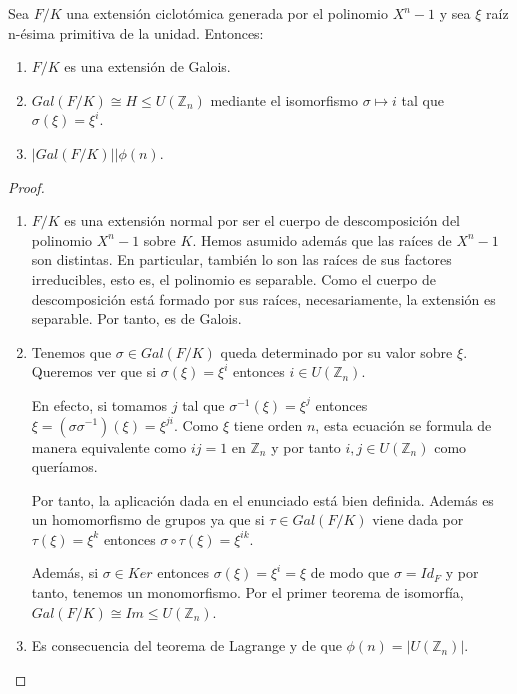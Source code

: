 \begin{theorem}
Sea $F/K$ una extensión ciclotómica generada por el polinomio $X^n-1$ y sea $\xi$ raíz n-ésima primitiva de la unidad. Entonces:

\begin{enumerate}
\item $F/K$ es una extensión de Galois. 
\item $Gal(F/K) \cong H \le U(\mathbb{Z}_n)$ mediante el isomorfismo $\sigma \mapsto i$ tal que $\sigma(\xi) = \xi^i$.
\item $|Gal(F/K)| | \phi(n)$. 
\end{enumerate}
\end{theorem}
\begin{proof}
\begin{enumerate}
\item $F/K$ es una extensión normal por ser el cuerpo de descomposición del polinomio $X^n - 1$ sobre $K$. Hemos asumido además que las raíces de $X^n - 1$ son distintas. En particular, también lo son las raíces de sus factores irreducibles, esto es, el polinomio es separable. Como el cuerpo de descomposición está formado por sus raíces, necesariamente, la extensión es separable. Por tanto, es de Galois. 

\item  Tenemos que $\sigma \in Gal(F/K)$ queda determinado por su valor sobre $\xi$. Queremos ver que si $\sigma(\xi) = \xi^i$ entonces $i \in U(\mathbb{Z}_n)$. 

En efecto, si tomamos $j$ tal que $\sigma^{-1}(\xi) = \xi^j$ entonces $\xi = (\sigma \sigma^{-1})( \xi) = \xi^{ji}$. Como $\xi$ tiene orden $n$, esta ecuación se formula de manera equivalente como $ij = 1$ en $\mathbb{Z}_n$ y por tanto $i,j \in U(\mathbb{Z}_n)$ como queríamos. 

Por tanto, la aplicación dada en el enunciado está bien definida. Además es un homomorfismo de grupos ya que si $\tau \in Gal(F/K)$ viene dada por $\tau(\xi) = \xi^k$ entonces $\sigma \circ \tau (\xi) = \xi^{ik}$. 

Además, si $\sigma \in Ker$ entonces $\sigma(\xi) = \xi^i = \xi$ de modo que $\sigma = Id_F$ y por tanto, tenemos un monomorfismo. Por el primer teorema de isomorfía, $Gal(F/K) \cong Im \le U(\mathbb{Z}_n)$.

\item Es consecuencia del teorema de Lagrange y de que $\phi(n) = |U(\mathbb{Z}_n)|$. 
\end{enumerate}
\end{proof}

